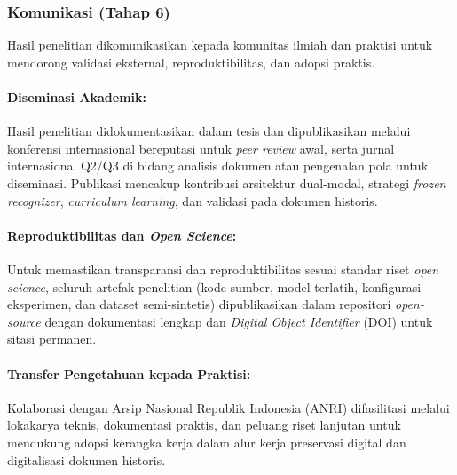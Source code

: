 \documentclass[12pt,a4paper]{article}
\begin{document}
\subsubsection{Komunikasi (Tahap 6)}
Hasil penelitian dikomunikasikan kepada komunitas ilmiah dan praktisi untuk mendorong validasi eksternal, reproduktibilitas, dan adopsi praktis.

\paragraph{Diseminasi Akademik:}
Hasil penelitian didokumentasikan dalam tesis dan dipublikasikan melalui konferensi internasional bereputasi untuk \textit{peer review} awal, serta jurnal internasional Q2/Q3 di bidang analisis dokumen atau pengenalan pola untuk diseminasi. Publikasi mencakup kontribusi arsitektur dual-modal, strategi \textit{frozen recognizer}, \textit{curriculum learning}, dan validasi pada dokumen historis.

\paragraph{Reproduktibilitas dan \textit{Open Science}:}
Untuk memastikan transparansi dan reproduktibilitas sesuai standar riset \textit{open science}, seluruh artefak penelitian (kode sumber, model terlatih, konfigurasi eksperimen, dan dataset semi-sintetis) dipublikasikan dalam repositori \textit{open-source} dengan dokumentasi lengkap dan \textit{Digital Object Identifier} (DOI) untuk sitasi permanen.

\paragraph{Transfer Pengetahuan kepada Praktisi:}
Kolaborasi dengan Arsip Nasional Republik Indonesia (ANRI) difasilitasi melalui lokakarya teknis, dokumentasi praktis, dan peluang riset lanjutan untuk mendukung adopsi kerangka kerja dalam alur kerja preservasi digital dan digitalisasi dokumen historis.


% 


\end{document}
